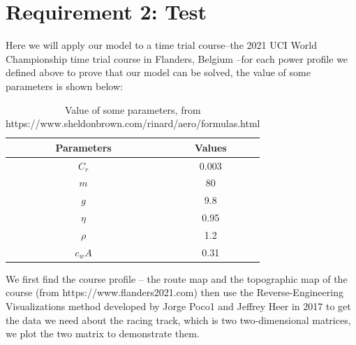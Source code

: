\documentclass[12pt]{article}
\begin{document}
\section{Requirement 2: Test}
Here we will apply our model to a time trial course--the 2021 UCI World Championship time trial course in Flanders, Belgium --for each power profile we defined
above to prove that our model can be solved, the value of some parameters is shown below:

\begin{table}[H]
    \centering
    \begin{tabular}{cc}
        \toprule
        \bf Parameters & \bf Values \\
        \midrule
        $C_r$          & 0.003      \\
        $m$            & 80         \\
        $g$            & 9.8        \\
        $\eta $        & 0.95       \\
        $\rho  $       & 1.2        \\
        $c_wA$         & 0.31       \\
        \bottomrule
    \end{tabular}
    \caption{Value of some parameters, from https://www.sheldonbrown.com/rinard/aero/formulas.html}
\end{table}
We first find the course profile -- the route map and the topographic map of the course (from https://www.flanders2021.com)
then use the Reverse-Engineering Visualizations method developed by Jorge Poco1 and Jeffrey Heer in 2017\cite{poco2017reverse} to get the data we need about the racing track,
which is two two-dimensional matrices, we plot the two matrix to demonstrate them.
\end{document}
